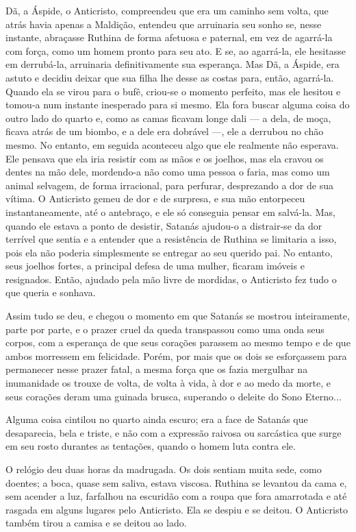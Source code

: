 Dã, a Áspide, o Anticristo, compreendeu que era um caminho sem volta,
que atrás havia apenas a Maldição, entendeu que arruinaria seu sonho se,
nesse instante, abraçasse Ruthina de forma afetuosa e paternal, em vez
de agarrá-la com força, como um homem pronto para seu ato. E se, ao
agarrá-la, ele hesitasse em derrubá-la, arruinaria definitivamente sua
esperança. Mas Dã, a Áspide, era astuto e decidiu deixar que sua filha
lhe desse as costas para, então, agarrá-la. Quando ela se virou para o
bufê, criou-se o momento perfeito, mas ele hesitou e tomou-a num
instante inesperado para si mesmo. Ela fora buscar alguma coisa do outro
lado do quarto e, como as camas ficavam longe dali --- a dela, de moça,
ficava atrás de um biombo, e a dele era dobrável ---, ele a derrubou no
chão mesmo. No entanto, em seguida aconteceu algo que ele realmente não
esperava. Ele pensava que ela iria resistir com as mãos e os joelhos,
mas ela cravou os dentes na mão dele, mordendo-a não como uma pessoa o
faria, mas como um animal selvagem, de forma irracional, para perfurar,
desprezando a dor de sua vítima. O Anticristo gemeu de dor e de
surpresa, e sua mão entorpeceu instantaneamente, até o antebraço, e ele
só conseguia pensar em salvá-la. Mas, quando ele estava a ponto de
desistir, Satanás ajudou-o a distrair-se da dor terrível que sentia e a
entender que a resistência de Ruthina se limitaria a isso, pois ela não
poderia simplesmente se entregar ao seu querido pai. No entanto, seus
joelhos fortes, a principal defesa de uma mulher, ficaram imóveis e
resignados. Então, ajudado pela mão livre de mordidas, o Anticristo fez
tudo o que queria e sonhava.

Assim tudo se deu, e chegou o momento em que Satanás se mostrou
inteiramente, parte por parte, e o prazer cruel da queda transpassou
como uma onda seus corpos, com a esperança de que seus corações parassem
ao mesmo tempo e de que ambos morressem em felicidade. Porém, por mais
que os dois se esforçassem para permanecer nesse prazer fatal, a mesma
força que os fazia mergulhar na inumanidade os trouxe de volta, de volta
à vida, à dor e ao medo da morte, e seus corações deram uma guinada
brusca, superando o deleite do Sono Eterno...

Alguma coisa cintilou no quarto ainda escuro; era a face de Satanás que
desaparecia, bela e triste, e não com a expressão raivosa ou sarcástica
que surge em seu rosto durantes as tentações, quando o homem luta contra
ele.

O relógio deu duas horas da madrugada. Os dois sentiam muita sede, como
doentes; a boca, quase sem saliva, estava viscosa. Ruthina se levantou
da cama e, sem acender a luz, farfalhou na escuridão com a roupa que
fora amarrotada e até rasgada em alguns lugares pelo Anticristo. Ela se
despiu e se deitou. O Anticristo também tirou a camisa e se deitou ao
lado.

